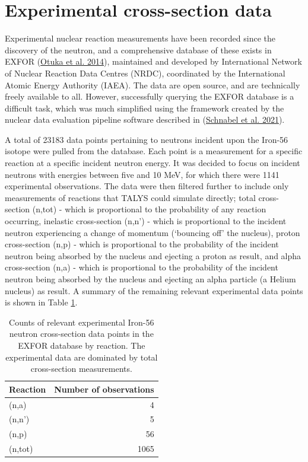 \documentclass[
  12pt,
  a4paper,
  twoside]{book}
\begin{document}
\hypertarget{Background:data}{%
\section{Experimental cross-section data}\label{Background:data}}

Experimental nuclear reaction measurements have been recorded since the discovery of the neutron, and a comprehensive database of these exists in EXFOR (\protect\hyperlink{ref-exfor}{Otuka et al. 2014}), maintained and developed by International Network of Nuclear Reaction Data Centres (NRDC), coordinated by the International Atomic Energy Authority (IAEA). The data are open source, and are technically freely available to all. However, successfully querying the EXFOR database is a difficult task, which was much simplified using the framework created by the nuclear data evaluation pipeline software described in (\protect\hyperlink{ref-Schnabel_2021}{Schnabel et al. 2021}).

A total of 23183 data points pertaining to neutrons incident upon the Iron-56 isotope were pulled from the database. Each point is a measurement for a specific reaction at a specific incident neutron energy. It was decided to focus on incident neutrons with energies between five and 10 MeV, for which there were 1141 experimental observations. The data were then filtered further to include only measurements of reactions that TALYS could simulate directly; total cross-section (n,tot) - which is proportional to the probability of any reaction occurring, inelastic cross-section (n,n') - which is proportional to the incident neutron experiencing a change of momentum (`bouncing off' the nucleus), proton cross-section (n,p) - which is proportional to the probability of the incident neutron being absorbed by the nucleus and ejecting a proton as result, and alpha cross-section (n,a) - which is proportional to the probability of the incident neutron being absorbed by the nucleus and ejecting an alpha particle (a Helium nucleus) as result. A summary of the remaining relevant experimental data points is shown in Table \ref{tab:exp-data-count}.

\begin{table}
  
  \caption{\label{tab:exp-data-count}Counts of relevant experimental Iron-56 neutron cross-section data points in the EXFOR database by reaction. The experimental data are dominated by total cross-section measurements.}
  \centering
  \begin{tabular}[t]{l|r}
  \hline
  Reaction & Number of observations\\
  \hline
  (n,a) & 4\\
  \hline
  (n,n') & 5\\
  \hline
  (n,p) & 56\\
  \hline
  (n,tot) & 1065\\
  \hline
  \end{tabular}
  \end{table}
\end{document}
